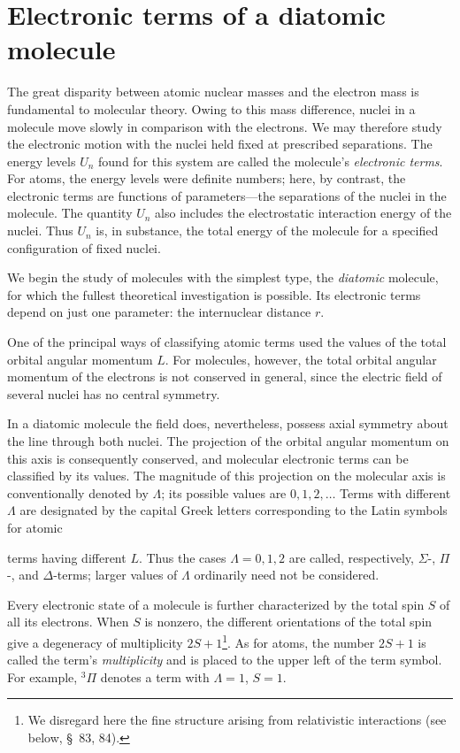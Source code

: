 \section{Electronic terms of a diatomic molecule}

The great disparity between atomic nuclear masses and the electron mass is fundamental to molecular theory. Owing to this mass difference, nuclei in a molecule move slowly in comparison with the electrons. We may therefore study the electronic motion with the nuclei held fixed at prescribed separations. The energy levels $U_n$ found for this system are called the molecule's \emph{electronic terms}. For atoms, the energy levels were definite numbers; here, by contrast, the electronic terms are functions of parameters---the separations of the nuclei in the molecule. The quantity $U_n$ also includes the electrostatic interaction energy of the nuclei. Thus $U_n$ is, in substance, the total energy of the molecule for a specified configuration of fixed nuclei.

We begin the study of molecules with the simplest type, the \emph{diatomic} molecule, for which the fullest theoretical investigation is possible. Its electronic terms depend on just one parameter: the internuclear distance $r$.

One of the principal ways of classifying atomic terms used the values of the total orbital angular momentum $L$. For molecules, however, the total orbital angular momentum of the electrons is not conserved in general, since the electric field of several nuclei has no central symmetry.

In a diatomic molecule the field does, nevertheless, possess axial symmetry about the line through both nuclei. The projection of the orbital angular momentum on this axis is consequently conserved, and molecular electronic terms can be classified by its values. The magnitude of this projection on the molecular axis is conventionally denoted by $\Lambda$; its possible values are $0,1,2,\ldots$ Terms with different $\Lambda$ are designated by the capital Greek letters corresponding to the Latin symbols for atomic

terms having different $L$. Thus the cases $\Lambda=0,1,2$ are called, respectively, $\Sigma$-, $\Pi$-, and $\Delta$-terms; larger values of $\Lambda$ ordinarily need not be considered.

Every electronic state of a molecule is further characterized by the total spin $S$ of all its electrons. When $S$ is nonzero, the different orientations of the total spin give a degeneracy of multiplicity $2S+1$\footnote{We disregard here the fine structure arising from relativistic interactions (see below, \S~83, 84).}. As for atoms, the number $2S+1$ is called the term's \emph{multiplicity} and is placed to the upper left of the term symbol. For example, ${}^3\Pi$ denotes a term with $\Lambda=1$, $S=1$.


